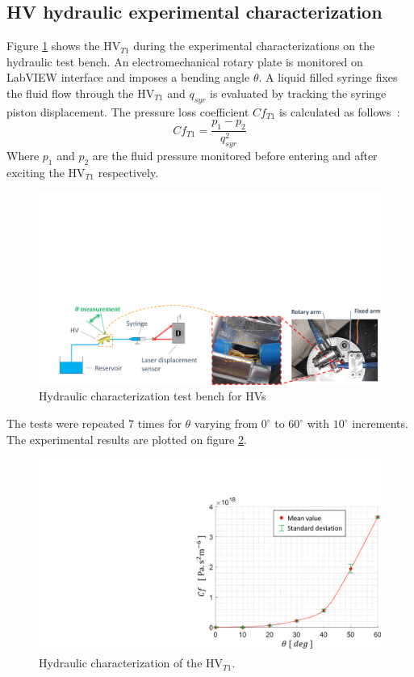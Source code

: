 \documentclass[3p,twocolumn,preprint]{elsarticle}
\begin{document}
	\subsection{HV hydraulic experimental characterization}	
	\label{subsec:HV hydraulic test bench presentation}
Figure \ref{fig:essais_hydraulique_VH} shows the HV$_{T1}$ during the experimental characterizations on the hydraulic test bench. An electromechanical rotary plate is monitored on LabVIEW interface and imposes a bending angle $\theta$. A liquid filled syringe fixes the fluid flow through the HV$_{T1}$ and $q_{syr}$ is evaluated by tracking the syringe piston displacement. The pressure loss coefficient $Cf_{T1}$ is calculated as \mbox{follows :}
\begin{equation}
	Cf_{T1} = \dfrac{p_1-p_2}{q_{syr}^2}
\end{equation}
Where $p_1$ and $p_2$ are the fluid pressure monitored before entering and after exciting the HV$_{T1}$ respectively.
\begin{figure}[!htb]
\begin{center}
	\captionsetup{justification=centering} 
	\includegraphics[trim={2cm 0cm 0cm 11cm},clip,width=.8\textwidth]{figures/essais_hydraulique_VH.pdf}
	\caption{Hydraulic characterization test bench for HVs}
	\label{fig:essais_hydraulique_VH}
\end{center}	
\end{figure}    
The tests were repeated 7 times for $\theta$ varying from $0^{\circ}$ to $60^{\circ}$ with $10^{\circ}$ increments. The experimental results are plotted on figure \ref{fig:resultats_essais_hydraulique_VH_D1mm}.
\begin{figure}[!htbp]
\centering
	\captionsetup{justification=centering}
	\includegraphics[trim={15.5cm 0cm 0cm 3.6cm},clip,width=0.6\linewidth]{figures/resultats_essais_hydraulique_VH_D1mm.pdf}
	\caption{Hydraulic characterization of the HV$_{T1}$.}
	\label{fig:resultats_essais_hydraulique_VH_D1mm}
\end{figure}
\end{document}
